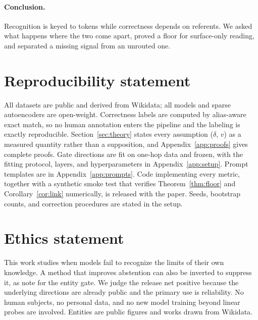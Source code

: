 \documentclass{article}
\begin{document}
\paragraph{Conclusion.} Recognition is keyed to tokens while correctness depends on referents. We
asked what happens where the two come apart, proved a floor for surface-only reading, and separated
a missing signal from an unrouted one.

\section*{Reproducibility statement}

All datasets are public and derived from Wikidata; all models and sparse autoencoders are
open-weight. Correctness labels are computed by alias-aware exact match, so no human annotation
enters the pipeline and the labeling is exactly reproducible. Section~\ref{sec:theory} states every
assumption ($\delta$, $v$) as a measured quantity rather than a supposition, and
Appendix~\ref{app:proofs} gives complete proofs. Gate directions are fit on one-hop data and frozen,
with the fitting protocol, layers, and hyperparameters in Appendix~\ref{app:setup}. Prompt templates
are in Appendix~\ref{app:prompts}. Code implementing every metric, together with a synthetic smoke
test that verifies Theorem~\ref{thm:floor} and Corollary~\ref{cor:link} numerically, is released with the
paper. Seeds, bootstrap counts, and correction procedures are stated in the setup.

\section*{Ethics statement}

This work studies when models fail to recognize the limits of their own knowledge. A method that
improves abstention can also be inverted to suppress it, as \citet{ferrando2025entity} note for the
entity gate. We judge the release net positive because the underlying directions are already public
and the primary use is reliability. No human subjects, no personal data, and no new model training
beyond linear probes are involved. Entities are public figures and works drawn from Wikidata.
\end{document}

